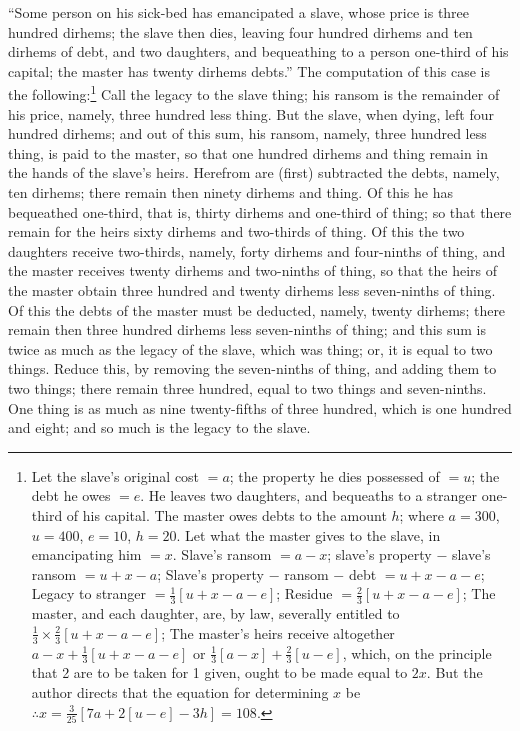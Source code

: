 ``Some person on his sick-bed has emancipated a slave, whose price is three hundred dirhems; the slave then dies, leaving four hundred dirhems and ten dirhems of debt, and two daughters, and bequeathing to a person one-third of his capital; the master has twenty dirhems debts.'' The computation of this case is the following:\footnote{Let the slave's original cost $=a$; the property he dies possessed of $=u$; the debt he owes $=e$. He leaves two daughters, and bequeaths to a stranger one-third of his capital. The master owes debts to the amount $h$; where $a = 300$, $u = 400$, $e = 10$, $h = 20$. Let what the master gives to the slave, in emancipating him $=x$. Slave's ransom $= a-x$; slave's property $-$ slave's ransom $= u+x-a$; Slave's property $-$ ransom $-$ debt $= u+x-a-e$; Legacy to stranger $= \frac{1}{3}[u+x-a-e]$; Residue $= \frac{2}{3}[u+x-a-e]$; The master, and each daughter, are, by law, severally entitled to $\frac{1}{3} \times \frac{2}{3}[u+x-a-e]$; The master's heirs receive altogether $a-x+\frac{1}{3}[u+x-a-e]$ or $\frac{1}{3}[a-x]+\frac{2}{3}[u-e]$, which, on the principle that 2 are to be taken for 1 given, ought to be made equal to $2x$. But the author directs that the equation for determining $x$ be $\therefore x = \frac{3}{25}[7a+2[u-e]-3h] = 108$.} Call the legacy to the slave thing; his ransom is the remainder of his price, namely, three hundred less thing. But the slave, when dying, left four hundred dirhems; and out of this sum, his ransom, namely, three hundred less thing, is paid to the master, so that one hundred dirhems and thing remain in the hands of the slave's heirs. Herefrom are (first) subtracted the debts, namely, ten dirhems; there remain then ninety dirhems and thing. Of this he has bequeathed one-third, that is, thirty dirhems and one-third of thing; so that there remain for the heirs sixty dirhems and two-thirds of thing. Of this the two daughters receive two-thirds, namely, forty dirhems and four-ninths of thing, and the master receives twenty dirhems and two-ninths of thing, so that the heirs of the master obtain three hundred and twenty dirhems less seven-ninths of thing. Of this the debts of the master must be deducted, namely, twenty dirhems; there remain then three hundred dirhems less seven-ninths of thing; and this sum is twice as much as the legacy of the slave, which was thing; or, it is equal to two things. Reduce this, by removing the seven-ninths of thing, and adding them to two things; there remain three hundred, equal to two things and seven-ninths. One thing is as much as nine twenty-fifths of three hundred, which is one hundred and eight; and so much is the legacy to the slave.

